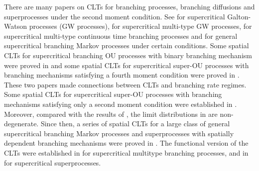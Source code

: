 \documentclass[12pt,a4paper]{amsart}
\theoremstyle{plain}
\theoremstyle{definition}
\numberwithin{equation}{section}
\begin{document}
There are many papers on CLTs for branching processes, branching diffusions and superprocesses under the second moment condition.
See \cite{Heyde1970A-rate, HeydeBrown1871An-invariance, HeydeLeslie1971Improved} for supercritical Galton-Watson processes (GW processes),
\cite{KestenStigum1966Additional,KestenStigum1966A-limit} for supercritical multi-type GW processes, \cite{Athreya1969Limit,Athreya1969LimitB,Athreya1971Some}
for supercritical multi-type continuous time branching processes and \cite{AsmussenHering1983Branching} for general supercritical branching Markov processes under certain conditions.
Some spatial CLTs for supercritical branching OU processes with binary branching mechanism were proved in \cite{AdamczakMilos2015CLT} and some
spatial CLTs for supercritical super-OU processes with branching mechanisms satisfying a fourth moment condition were proved in \cite{Milos2012Spatial}.
These two papers made connections between CLTs and branching rate regimes.
Some spatial CLTs  for supercritical super-OU  processes with branching mechanisms satisfying only a second moment condition were established in \cite{RenSongZhang2014Central}.
Moreover, compared with the results of \cite{AdamczakMilos2015CLT,Milos2012Spatial}, the limit distributions in \cite{RenSongZhang2014Central} are non-degenerate.
Since then, a series of spatial CLTs for a large class of general supercritical branching Markov processes and superprocesses with spatially dependent branching mechanisms were proved in \cite{RenSongZhang2014CentralB,RenSongZhang2015Central,RenSongZhang2017Central}.
The functional version of the CLTs were established in \cite{Janson2004Functional} for supercritical multitype branching processes, and in \cite{RenSongZhang2017Functional} for supercritical superprocesses.
\end{document}

